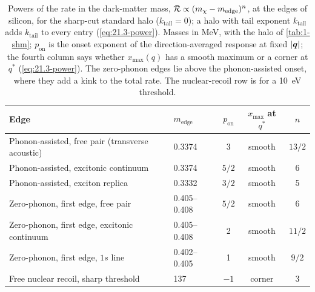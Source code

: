 \begin{table}[tbp]
  \caption{Powers of the rate in the dark-matter mass, $\mathcal{R} \propto (m_{\chi} - m_{\mathrm{edge}})^{n}$, at the edges of silicon, for the sharp-cut standard halo ($k_{\mathrm{tail}} = 0$); a halo with tail exponent $k_{\mathrm{tail}}$ adds $k_{\mathrm{tail}}$ to every entry (\cref{eq:21.3-power}). Masses in MeV, with the halo of \cref{tab:1-shm}; $p_{\mathrm{on}}$ is the onset exponent of the direction-averaged response at fixed $|\bm{q}|$; the fourth column says whether $x_{\mathrm{max}}(q)$ has a smooth maximum or a corner at $q^*$ (\cref{eq:21.3-power}). The zero-phonon edges lie above the phonon-assisted onset, where they add a kink to the total rate. The nuclear-recoil row is for a \SI{10}{eV} threshold.}
  \label{tab:21-edge}
  \centering\small
  \begin{tabular}{@{}llccc@{}}
    \toprule
    Edge & $m_{\mathrm{edge}}$ & $p_{\mathrm{on}}$ & $x_{\mathrm{max}}$ at $q^*$ & $n$ \\
    \midrule
    Phonon-assisted, free pair (transverse acoustic) & 0.3374 & 3 & smooth & $13/2$ \\
    Phonon-assisted, excitonic continuum & 0.3374 & $5/2$ & smooth & 6 \\
    Phonon-assisted, exciton replica & 0.3332 & $3/2$ & smooth & 5 \\
    Zero-phonon, first edge, free pair & 0.405--0.408 & $5/2$ & smooth & 6 \\
    Zero-phonon, first edge, excitonic continuum & 0.405--0.408 & 2 & smooth & $11/2$ \\
    Zero-phonon, first edge, $1s$ line & 0.402--0.405 & 1 & smooth & $9/2$ \\
    Free nuclear recoil, sharp threshold & 137 & $-1$ & corner & 3 \\
    \bottomrule
  \end{tabular}
\end{table}

